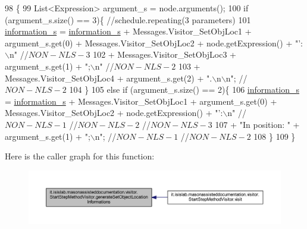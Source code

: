 \begin{DoxyCode}
98                                                                               \{
99         List<Expression> argument\_s = node.arguments();
100         \textcolor{keywordflow}{if} (argument\_s.size() == 3)\{    \textcolor{comment}{//schedule.repeating(3 parameters)}
101             \hyperlink{classit_1_1isislab_1_1masonassisteddocumentation_1_1visitor_1_1_code_visitor_a628ab846d2f4de647f171060ebe73774}{information\_s} = \hyperlink{classit_1_1isislab_1_1masonassisteddocumentation_1_1visitor_1_1_code_visitor_a628ab846d2f4de647f171060ebe73774}{information\_s} + Messages.Visitor\_SetObjLoc1 + 
      argument\_s.get(0) + Messages.Visitor\_SetObjLoc2 + node.getExpression() + \textcolor{stringliteral}{"': \(\backslash\)n"} \textcolor{comment}{//$NON-NLS-3$}
102                                 + Messages.Visitor\_SetObjLoc3 + argument\_s.get(1) + \textcolor{stringliteral}{";\(\backslash\)n"} \textcolor{comment}{//$NON-NLS-2$}
103                                 + Messages.Visitor\_SetObjLoc4 + argument\_s.get(2) + \textcolor{stringliteral}{".\(\backslash\)n\(\backslash\)n"}; \textcolor{comment}{//$NON-NLS-2$}
104         \}
105         \textcolor{keywordflow}{else} \textcolor{keywordflow}{if} (argument\_s.size() == 2)\{
106             \hyperlink{classit_1_1isislab_1_1masonassisteddocumentation_1_1visitor_1_1_code_visitor_a628ab846d2f4de647f171060ebe73774}{information\_s} = \hyperlink{classit_1_1isislab_1_1masonassisteddocumentation_1_1visitor_1_1_code_visitor_a628ab846d2f4de647f171060ebe73774}{information\_s} + Messages.Visitor\_SetObjLoc1 + 
      argument\_s.get(0) + Messages.Visitor\_SetObjLoc2 + node.getExpression() + \textcolor{stringliteral}{"':\(\backslash\)n"} \textcolor{comment}{//$NON-NLS-1$ //$NON-NLS-2$
       //$NON-NLS-3$}
107                     + \textcolor{stringliteral}{"In position: "} + argument\_s.get(1) + \textcolor{stringliteral}{";\(\backslash\)n"}; \textcolor{comment}{//$NON-NLS-1$ //$NON-NLS-2$}
108         \}
109     \}
\end{DoxyCode}


Here is the caller graph for this function\-:
\nopagebreak
\begin{figure}[H]
\begin{center}
\leavevmode
\includegraphics[width=350pt]{classit_1_1isislab_1_1masonassisteddocumentation_1_1visitor_1_1_start_step_method_visitor_a737cae4933895eb73a56e06059cb3edf_icgraph}
\end{center}
\end{figure}


